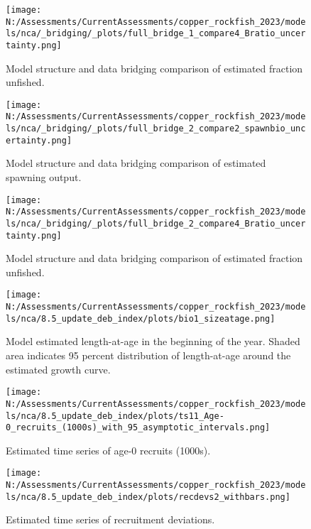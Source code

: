 \documentclass[11pt,
  english,
  letterpaper,
]{article}
\begin{document}
\begin{figure}
\centering
\texttt{[image: N:/Assessments/CurrentAssessments/copper\_rockfish\_2023/models/nca/\_bridging/\_plots/full\_bridge\_1\_compare4\_Bratio\_uncertainty.png]}
\caption{Model structure and data bridging comparison of estimated fraction unfished.\label{fig:data-bridge-depl-1}}
\end{figure}

\begin{figure}
\centering
\texttt{[image: N:/Assessments/CurrentAssessments/copper\_rockfish\_2023/models/nca/\_bridging/\_plots/full\_bridge\_2\_compare2\_spawnbio\_uncertainty.png]}
\caption{Model structure and data bridging comparison of estimated spawning output.\label{fig:data-bridge-ssb-2}}
\end{figure}

\begin{figure}
\centering
\texttt{[image: N:/Assessments/CurrentAssessments/copper\_rockfish\_2023/models/nca/\_bridging/\_plots/full\_bridge\_2\_compare4\_Bratio\_uncertainty.png]}
\caption{Model structure and data bridging comparison of estimated fraction unfished.\label{fig:data-bridge-depl-2}}
\end{figure}

\begin{figure}
\centering
\texttt{[image: N:/Assessments/CurrentAssessments/copper\_rockfish\_2023/models/nca/8.5\_update\_deb\_index/plots/bio1\_sizeatage.png]}
\caption{Model estimated length-at-age in the beginning of the year. Shaded area indicates 95 percent distribution of length-at-age around the estimated growth curve.\label{fig:mod-est-len-age}}
\end{figure}

\begin{figure}
\centering
\texttt{[image: N:/Assessments/CurrentAssessments/copper\_rockfish\_2023/models/nca/8.5\_update\_deb\_index/plots/ts11\_Age-0\_recruits\_(1000s)\_with\_95\_asymptotic\_intervals.png]}
\caption{Estimated time series of age-0 recruits (1000s).\label{fig:recruits}}
\end{figure}

\begin{figure}
\centering
\texttt{[image: N:/Assessments/CurrentAssessments/copper\_rockfish\_2023/models/nca/8.5\_update\_deb\_index/plots/recdevs2\_withbars.png]}
\caption{Estimated time series of recruitment deviations.\label{fig:rec-devs}}
\end{figure}
\end{document}

